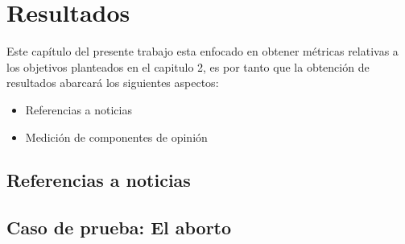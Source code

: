 \section{Resultados}
	Este capítulo del presente trabajo esta enfocado en obtener métricas relativas a los objetivos planteados en el capitulo 2, es por tanto que la obtención de resultados abarcará los siguientes aspectos:
	
	\begin{itemize}
		\item Referencias a noticias
		\item Medición de componentes de opinión  
	\end{itemize}

\subsection{Referencias a noticias}\label{subsec:refnoticias}

	
	
\newpage	
\subsection{Caso de prueba: El aborto}

	
